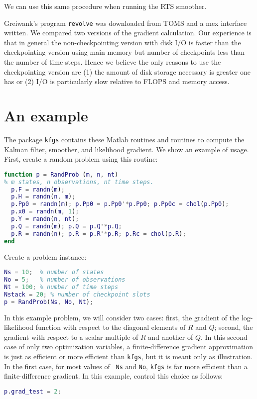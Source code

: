 \documentclass[10pt,fleqn]{article}
\begin{document}
We can use this same procedure when running the RTS smoother.

Greiwank's program {\tt revolve} was downloaded from TOMS and a mex interface
written. We compared two versions of the gradient calculation. Our experience is
that in general the non-checkpointing version with disk I/O is faster than the
checkpointing version using main memory but number of checkpoints less than the
number of time steps. Hence we believe the only reasons to use the checkpointing
version are (1) the amount of disk storage necessary is greater one has or (2)
I/O is particularly slow relative to FLOPS and memory access.

\section{An example}
The package {\tt kfgs} contains these Matlab routines and routines to compute
the Kalman filter, smoother, and likelihood gradient. We show an example of
usage. First, create a random problem using this routine:
\begin{lstlisting}[language=matlab,basicstyle=\footnotesize]
function p = RandProb (m, n, nt)
% m states, n observations, nt time steps.
  p.F = randn(m);
  p.H = randn(n, m);
  p.Pp0 = randn(m); p.Pp0 = p.Pp0'*p.Pp0; p.Pp0c = chol(p.Pp0);
  p.x0 = randn(m, 1);
  p.Y = randn(n, nt);
  p.Q = randn(m); p.Q = p.Q'*p.Q;
  p.R = randn(n); p.R = p.R'*p.R; p.Rc = chol(p.R);
end
\end{lstlisting}
Create a problem instance:
\begin{lstlisting}[language=matlab,basicstyle=\footnotesize]
% Set up a random problem. p holds F, H, Q, R, etc.
Ns = 10;  % number of states
No = 5;   % number of observations
Nt = 100; % number of time steps
Nstack = 20; % number of checkpoint slots
p = RandProb(Ns, No, Nt);
\end{lstlisting}

In this example problem, we will consider two cases: first, the gradient of the
log-likelihood function with respect to the diagonal elements of $R$ and $Q$;
second, the gradient with respect to a scalar multiple of $R$ and another of
$Q$. In this second case of only two optimization variables, a finite-difference
gradient approximation is just as efficient or more efficient than {\tt kfgs},
but it is meant only as illustration. In the first case, for most values of {\tt
  Ns} and {\tt No}, {\tt kfgs} is far more efficient than a finite-difference
gradient. In this example, control this choice as follows:
\begin{lstlisting}[language=matlab,basicstyle=\footnotesize]
% 1 or 2. Test different types of parameterizations.
p.grad_test = 2;
\end{lstlisting}
\end{document}
